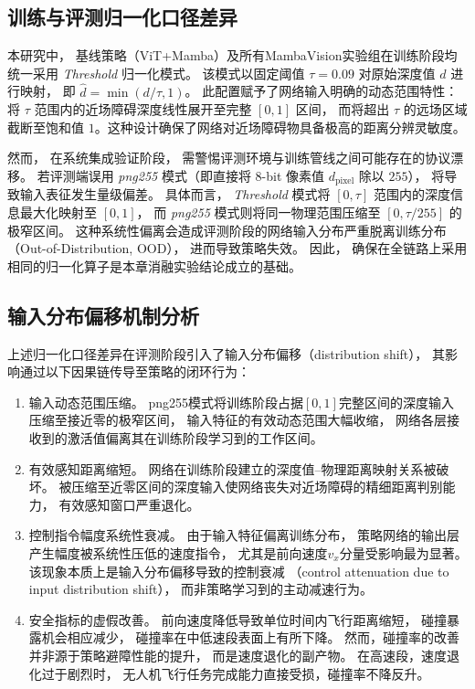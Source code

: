 \subsection{训练与评测归一化口径差异}

本研究中，
基线策略（ViT+Mamba）及所有MambaVision实验组在训练阶段均统一采用 \textit{Threshold} 归一化模式。
该模式以固定阈值 $\tau = 0.09$ 对原始深度值 $d$ 进行映射，
即 $\hat{d} = \min(d / \tau, 1)$。
此配置赋予了网络输入明确的动态范围特性：
将 $\tau$ 范围内的近场障碍深度线性展开至完整 $[0, 1]$ 区间，
而将超出 $\tau$ 的远场区域截断至饱和值 $1$。这种设计确保了网络对近场障碍物具备极高的距离分辨灵敏度。

然而，
在系统集成验证阶段，
需警惕评测环境与训练管线之间可能存在的协议漂移。
若评测端误用 \textit{png255} 模式（即直接将 8-bit 像素值 $d_{\text{pixel}}$ 除以 $255$），
将导致输入表征发生量级偏差。
具体而言，
\textit{Threshold} 模式将 $[0, \tau]$ 范围内的深度信息最大化映射至 $[0, 1]$，
而 \textit{png255} 模式则将同一物理范围压缩至 $[0, \tau/255]$ 的极窄区间。
这种系统性偏离会造成评测阶段的网络输入分布严重脱离训练分布（Out-of-Distribution, OOD），
进而导致策略失效。
因此，
确保在全链路上采用相同的归一化算子是本章消融实验结论成立的基础。

\subsection{输入分布偏移机制分析}

上述归一化口径差异在评测阶段引入了输入分布偏移（distribution shift），
其影响通过以下因果链传导至策略的闭环行为：

\begin{enumerate}
  \item 输入动态范围压缩。
    png255模式将训练阶段占据$[0, 1]$完整区间的深度输入
    压缩至接近零的极窄区间，
    输入特征的有效动态范围大幅收缩，
    网络各层接收到的激活值偏离其在训练阶段学习到的工作区间。
  \item 有效感知距离缩短。
    网络在训练阶段建立的深度值--物理距离映射关系被破坏。
    被压缩至近零区间的深度输入使网络丧失对近场障碍的精细距离判别能力，
    有效感知窗口严重退化。
  \item 控制指令幅度系统性衰减。
    由于输入特征偏离训练分布，
    策略网络的输出层产生幅度被系统性压低的速度指令，
    尤其是前向速度$v_x$分量受影响最为显著。
    该现象本质上是输入分布偏移导致的控制衰减
    （control attenuation due to input distribution shift），
    而非策略学习到的主动减速行为。
  \item 安全指标的虚假改善。
    前向速度降低导致单位时间内飞行距离缩短，
    碰撞暴露机会相应减少，
    碰撞率在中低速段表面上有所下降。
    然而，碰撞率的改善并非源于策略避障性能的提升，
    而是速度退化的副产物。
    在高速段，速度退化过于剧烈时，
    无人机飞行任务完成能力直接受损，碰撞率不降反升。
\end{enumerate}

